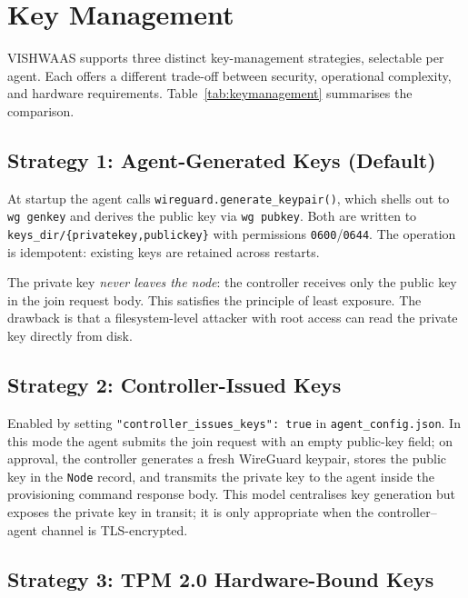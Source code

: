\documentclass[conference]{IEEEtran}
\begin{document}
\FloatBarrier
\section{Key Management}
\label{sec:keymanagement}

VISHWAAS supports three distinct key-management strategies, selectable per agent.
Each offers a different trade-off between security, operational complexity, and
hardware requirements. Table~\ref{tab:keymanagement} summarises the comparison.

\subsection{Strategy 1: Agent-Generated Keys (Default)}

At startup the agent calls \texttt{wireguard.generate\_keypair()}, which shells
out to \texttt{wg genkey} and derives the public key via \texttt{wg pubkey}. Both
are written to \texttt{keys\_dir/\{privatekey,publickey\}} with permissions
\texttt{0600}/\texttt{0644}. The operation is idempotent: existing keys are
retained across restarts.

The private key \emph{never leaves the node}: the controller receives only the
public key in the join request body. This satisfies the principle of least
exposure.  The drawback is that a filesystem-level attacker with root access can
read the private key directly from disk.

\subsection{Strategy 2: Controller-Issued Keys}

Enabled by setting \texttt{"controller\_issues\_keys": true} in
\texttt{agent\_config.json}.  In this mode the agent submits the join request
with an empty public-key field; on approval, the controller generates a fresh
WireGuard keypair, stores the public key in the \texttt{Node} record, and
transmits the private key to the agent inside the provisioning command response body. This model centralises key generation but exposes the private key
in transit; it is only appropriate when the controller--agent channel is
TLS-encrypted.

\subsection{Strategy 3: TPM 2.0 Hardware-Bound Keys}
\end{document}
